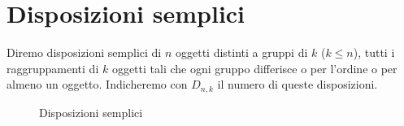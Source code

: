 \section{Disposizioni semplici}
\begin{defn}
Diremo disposizioni semplici di $n$ oggetti distinti a gruppi di $k$ ($ k\leqslant n$), tutti i raggruppamenti di $k$ oggetti tali che ogni gruppo differisce o per l'ordine o per almeno un oggetto. Indicheremo con $D_{n,k}$ il numero di queste disposizioni.
\end{defn}
\begin{figure}
	\centering
	
	\caption{Disposizioni semplici}
	\label{fig:dispsemplici}
\end{figure}
